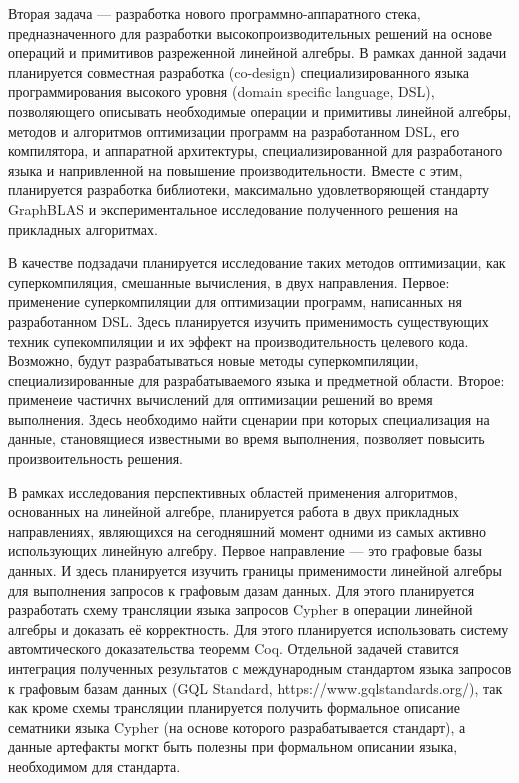 \documentclass[12pt]{article}  %
\theoremstyle{remark}
\begin{document}
Вторая задача --- разработка нового программно-аппаратного стека, предназначенного для разработки высокопроизводительных решений на основе операций и примитивов разреженной линейной алгебры. В рамках данной задачи планируется совместная разработка (co-design) специализированного языка программирования высокого уровня (domain specific language, DSL), позволяющего описывать необходимые операции и примитивы линейной алгебры, методов и алгоритмов оптимизации программ на разработанном DSL, его компилятора, и аппаратной архитектуры, специализированной для разработаного языка и напривленной на повышение производительности. Вместе с этим, планируется разработка библиотеки, максимально удовлетворяющей стандарту GraphBLAS и экспериментальное исследование полученного решения на прикладных алгоритмах.

В качестве подзадачи планируется исследование таких методов оптимизации, как суперкомпиляция, смешанные вычисления, в двух направления. Первое: применение суперкомпиляции для оптимизации программ, написанных ня разработанном DSL. Здесь планируется изучить применимость существующих техник супекомпиляции и их эффект на производительность целевого кода. Возможно, будут разрабатываться новые методы суперкомпиляции, специализированные для разрабатываемого языка и предметной области. Второе: применеие частичнх вычислений для оптимизации решений во время выполнения. Здесь необходимо найти сценарии при которых специализация на данные, становящиеся известными во время выполнения, позволяет повысить произвоительность решения.

В рамках исследования перспективных областей применения алгоритмов, основанных на линейной алгебре, планируется работа в двух прикладных направлениях, являющихся на сегодняшний момент одними из самых активно использующих линейную алгебру. Первое направление --- это графовые базы данных. И здесь планируется изучить границы применимости линейной алгебры для выполнения запросов к графовым дазам данных. Для этого планируется разработать схему трансляции языка запросов Cypher в операции линейной алгебры и доказать её корректность. Для этого планируется использовать систему автомтического доказательства теоремм Coq. Отдельной задачей ставится интеграция полученных результатов с международным стандартом языка запросов к графовым базам данных (GQL Standard, https://www.gqlstandards.org/), так как кроме схемы трансляции планируется получить формальное описание сематники языка Cypher (на основе которого разрабатывается стандарт), а данные артефакты могкт быть полезны при формальном описании языка, необходимом для стандарта.
\end{document}
